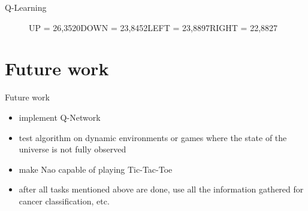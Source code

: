 \documentclass{beamer}
\begin{document}
\begin{frame}{Q-Learning}
\begin{figure}[hp]
  \caption*{\newline UP = 97,6530\newline DOWN = 100,0000\newline LEFT = 93,8538\newline RIGHT = 92,5261}\label{fig:fb}
\endminipage\hfill
{}%
   \caption*{\newline UP = 26,3520\newline DOWN = 23,8452\newline LEFT = 23,8897\newline RIGHT = 22,8827}\label{fig:fc}
 
\endminipage
\end{figure}
\end{frame}


\section{Future work}
\begin{frame}{Future work}
	\begin{itemize}
		\item implement Q-Network
		\item test algorithm on dynamic environments or games where the state of the universe is not fully observed
		\item make Nao capable of playing Tic-Tac-Toe
		\item after all tasks mentioned above are done, use all the information gathered for cancer classification, etc.
	\end{itemize}
\end{frame}
\end{document}
